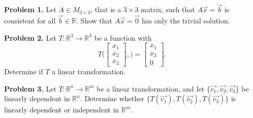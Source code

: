 \documentclass[11pt]{article}
\begin{document}

\bigskip


\bigskip

{\bf Problem 1.} Let $A \in M_{3\times3}$, that is a $3\times3$ matrix, such that $A\vec{x} = \vec{b}$ is consistent for all $\vec{b} \in \mathbb{R}$. Show that $A\vec{x} = \vec{0}$ has only the trivial solution.

\bigskip
\bigskip
\bigskip
\bigskip
\bigskip
\bigskip
\bigskip
\bigskip
\bigskip
\bigskip
\bigskip
\bigskip

{\bf Problem 2.}
Let $T: \mathbb{R}^3 \rightarrow \mathbb{R}^3$ be a function with 
$$T\Bigg( \begin{bmatrix}
x_1 \\ x_2 \\ x_3
\end{bmatrix}, \Bigg)  = \begin{bmatrix}
x_1 \\ x_2 \\ 0
\end{bmatrix}.$$ 
Determine if $T$ a linear transformation.


\bigskip
\bigskip
\bigskip
\bigskip
\bigskip
\bigskip
\bigskip
\bigskip
\bigskip
\bigskip
\bigskip
\bigskip

{\bf Problem 3.} Let $T: \mathbb{R}^n \rightarrow \mathbb{R}^m$ be a linear transformation, and let 
$\{ \vec{v_1}, \vec{v_2}, \vec{v_3} \}$ be linearly dependent in $\mathbb{R}^n$. Determine whether 
$\{ T(\vec{v_1}), T(\vec{v_2}), T(\vec{v_3}) \}$ is linearly dependent or independent in $\mathbb{R}^m$.
\end{document}
